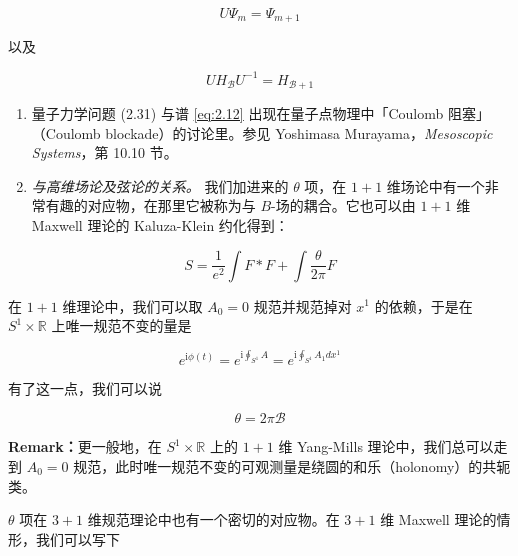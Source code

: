 \begin{equation}
  U\Psi_m=\Psi_{m+1}
  \tag{2.13}
  \label{eq:2.13}
\end{equation}

以及

\begin{equation}
  UH_{\mathcal{B}}U^{-1}=H_{\mathcal{B}+1}
  \tag{2.14}
  \label{eq:2.14}
\end{equation}

\begin{enumerate}[start=5]
  \item 量子力学问题 (2.31) 与谱 \eqref{eq:2.12} 出现在量子点物理中「Coulomb 阻塞」（Coulomb blockade）的讨论里。参见 Yoshimasa Murayama，\emph{Mesoscopic Systems}，第 10.10 节。
  \item \emph{与高维场论及弦论的关系。} 我们加进来的 $\theta$ 项，在 $1+1$ 维场论中有一个非常有趣的对应物，在那里它被称为与 $B$-场的耦合。它也可以由 $1+1$ 维 Maxwell 理论的 Kaluza-Klein 约化得到：
\end{enumerate}

\begin{equation}
  S=\frac{1}{e^{2}}\int F\ast F+\int\frac{\theta}{2\pi}F
  \tag{2.15}
  \label{eq:2.15}
\end{equation}

在 $1+1$ 维理论中，我们可以取 $A_0=0$ 规范并规范掉对 $x^{1}$ 的依赖，于是在 $S^{1}\times\mathbb{R}$ 上唯一规范不变的量是

\begin{equation}
  e^{\mathrm{i}\phi(t)}=e^{\mathrm{i}\oint_{S^{1}}A}=e^{\mathrm{i}\oint_{S^{1}}A_1dx^{1}}
  \tag{2.16}
  \label{eq:2.16}
\end{equation}

有了这一点，我们可以说

\begin{equation}
  \theta=2\pi\mathcal{B}
  \tag{2.17}
  \label{eq:2.17}
\end{equation}

\textbf{Remark：}更一般地，在 $S^{1}\times\mathbb{R}$ 上的 $1+1$ 维 Yang-Mills 理论中，我们总可以走到 $A_0=0$ 规范，此时唯一规范不变的可观测量是绕圆的和乐（holonomy）的共轭类。


$\theta$ 项在 $3+1$ 维规范理论中也有一个密切的对应物。在 $3+1$ 维 Maxwell 理论的情形，我们可以写下


